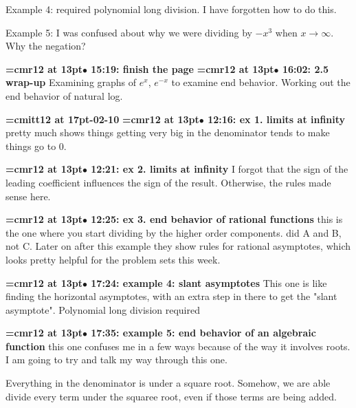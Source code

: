 Example 4: required polynomial long division. I have forgotten how to do this.
\par

Example 5: I was confused about why we were dividing by $-x^3$ when $x \to \infty$. Why the negation?
\par

{\smallskip\noindent\bf\font\titlefont=cmr12 at 13pt\titlefont $\bullet$ 15:19: finish the page}\smallskip
{\smallskip\noindent\bf\font\titlefont=cmr12 at 13pt\titlefont $\bullet$ 16:02: 2.5 wrap-up}\smallskip
Examining graphs of $e^x$, $e^{-x}$ to examine end behavior. Working out the end behavior of natural log.
\par

{\medskip\noindent\bf\font\titlefont=cmitt12 at 17pt-02-10}\medskip
{\smallskip\noindent\bf\font\titlefont=cmr12 at 13pt\titlefont $\bullet$ 12:16: ex 1. limits at infinity}\smallskip
pretty much shows things getting very big in the denominator tends to make things go to 0.
\par

{\smallskip\noindent\bf\font\titlefont=cmr12 at 13pt\titlefont $\bullet$ 12:21: ex 2. limits at infinity}\smallskip
I forgot that the sign of the leading coefficient influences the sign of the result. Otherwise, the rules made sense here.
\par

{\smallskip\noindent\bf\font\titlefont=cmr12 at 13pt\titlefont $\bullet$ 12:25: ex 3. end behavior of rational functions}\smallskip
this is the one where you start dividing by the higher order components. did A and B, not C. Later on after this example they show rules for rational asymptotes, which looks pretty helpful for the problem sets this week.
\par

{\smallskip\noindent\bf\font\titlefont=cmr12 at 13pt\titlefont $\bullet$ 17:24: example 4: slant asymptotes}\smallskip
This one is like finding the horizontal asymptotes, with an extra step in there to get the "slant asymptote". Polynomial long division required
\par

{\smallskip\noindent\bf\font\titlefont=cmr12 at 13pt\titlefont $\bullet$ 17:35: example 5: end behavior of an algebraic function}\smallskip
this one confuses me in a few ways because of the way it involves roots. I am going to try and  talk my way through this one.
\par

Everything in the denominator is under a square root. Somehow, we are able divide every term under the squaree root, even if those terms are being added.
\par

